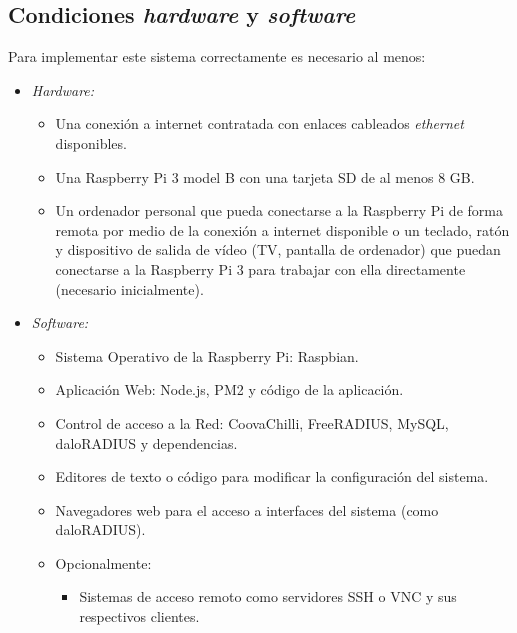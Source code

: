\subsection*{Condiciones \emph{hardware} y \emph{software}}

Para implementar este sistema correctamente es necesario al menos:
\begin{itemize}
\item \emph{Hardware:}
\begin{itemize}
\item Una conexión a internet contratada con enlaces cableados \emph{ethernet} disponibles.
\item Una Raspberry Pi 3 model B con una tarjeta SD de al menos 8 GB.
\item Un ordenador personal que pueda conectarse a la Raspberry Pi de forma remota por medio de la conexión a internet disponible o un teclado, ratón y dispositivo de salida de vídeo (TV, pantalla de ordenador) que puedan conectarse a la Raspberry Pi 3 para trabajar con ella directamente (necesario inicialmente).
\end{itemize}
\item \emph{Software:}
\begin{itemize}
\item Sistema Operativo de la Raspberry Pi: Raspbian.
\item Aplicación Web: Node.js, PM2 y código de la aplicación.
\item Control de acceso a la Red: CoovaChilli, FreeRADIUS, MySQL, daloRADIUS y dependencias.
\item Editores de texto o código para modificar la configuración del sistema.
\item Navegadores web para el acceso a interfaces del sistema (como daloRADIUS).
\item Opcionalmente:
\begin{itemize}
\item Sistemas de acceso remoto como servidores \acrshort{SSH} o \acrshort{VNC} y sus respectivos clientes.
\end{itemize}
\end{itemize}
\end{itemize}


